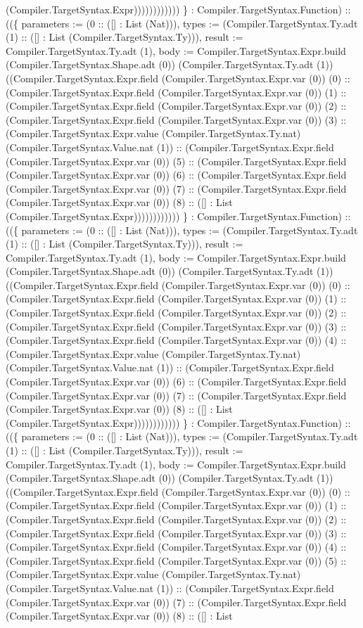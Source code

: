 \documentclass[11pt]{article}
\begin{document}
(Compiler.TargetSyntax.Expr)))))))))))) \} : Compiler.TargetSyntax.Function) :: ((\{ parameters := (0 :: ([] : List (Nat))), types := (Compiler.TargetSyntax.Ty.adt (1) :: ([] : List (Compiler.TargetSyntax.Ty))), result := Compiler.TargetSyntax.Ty.adt (1), body := Compiler.TargetSyntax.Expr.build (Compiler.TargetSyntax.Shape.adt (0)) (Compiler.TargetSyntax.Ty.adt (1)) ((Compiler.TargetSyntax.Expr.field (Compiler.TargetSyntax.Expr.var (0)) (0) :: (Compiler.TargetSyntax.Expr.field (Compiler.TargetSyntax.Expr.var (0)) (1) :: (Compiler.TargetSyntax.Expr.field (Compiler.TargetSyntax.Expr.var (0)) (2) :: (Compiler.TargetSyntax.Expr.field (Compiler.TargetSyntax.Expr.var (0)) (3) :: (Compiler.TargetSyntax.Expr.value (Compiler.TargetSyntax.Ty.nat) (Compiler.TargetSyntax.Value.nat (1)) :: (Compiler.TargetSyntax.Expr.field (Compiler.TargetSyntax.Expr.var (0)) (5) :: (Compiler.TargetSyntax.Expr.field (Compiler.TargetSyntax.Expr.var (0)) (6) :: (Compiler.TargetSyntax.Expr.field (Compiler.TargetSyntax.Expr.var (0)) (7) :: (Compiler.TargetSyntax.Expr.field (Compiler.TargetSyntax.Expr.var (0)) (8) :: ([] : List (Compiler.TargetSyntax.Expr)))))))))))) \} : Compiler.TargetSyntax.Function) :: ((\{ parameters := (0 :: ([] : List (Nat))), types := (Compiler.TargetSyntax.Ty.adt (1) :: ([] : List (Compiler.TargetSyntax.Ty))), result := Compiler.TargetSyntax.Ty.adt (1), body := Compiler.TargetSyntax.Expr.build (Compiler.TargetSyntax.Shape.adt (0)) (Compiler.TargetSyntax.Ty.adt (1)) ((Compiler.TargetSyntax.Expr.field (Compiler.TargetSyntax.Expr.var (0)) (0) :: (Compiler.TargetSyntax.Expr.field (Compiler.TargetSyntax.Expr.var (0)) (1) :: (Compiler.TargetSyntax.Expr.field (Compiler.TargetSyntax.Expr.var (0)) (2) :: (Compiler.TargetSyntax.Expr.field (Compiler.TargetSyntax.Expr.var (0)) (3) :: (Compiler.TargetSyntax.Expr.field (Compiler.TargetSyntax.Expr.var (0)) (4) :: (Compiler.TargetSyntax.Expr.value (Compiler.TargetSyntax.Ty.nat) (Compiler.TargetSyntax.Value.nat (1)) :: (Compiler.TargetSyntax.Expr.field (Compiler.TargetSyntax.Expr.var (0)) (6) :: (Compiler.TargetSyntax.Expr.field (Compiler.TargetSyntax.Expr.var (0)) (7) :: (Compiler.TargetSyntax.Expr.field (Compiler.TargetSyntax.Expr.var (0)) (8) :: ([] : List (Compiler.TargetSyntax.Expr)))))))))))) \} : Compiler.TargetSyntax.Function) :: ((\{ parameters := (0 :: ([] : List (Nat))), types := (Compiler.TargetSyntax.Ty.adt (1) :: ([] : List (Compiler.TargetSyntax.Ty))), result := Compiler.TargetSyntax.Ty.adt (1), body := Compiler.TargetSyntax.Expr.build (Compiler.TargetSyntax.Shape.adt (0)) (Compiler.TargetSyntax.Ty.adt (1)) ((Compiler.TargetSyntax.Expr.field (Compiler.TargetSyntax.Expr.var (0)) (0) :: (Compiler.TargetSyntax.Expr.field (Compiler.TargetSyntax.Expr.var (0)) (1) :: (Compiler.TargetSyntax.Expr.field (Compiler.TargetSyntax.Expr.var (0)) (2) :: (Compiler.TargetSyntax.Expr.field (Compiler.TargetSyntax.Expr.var (0)) (3) :: (Compiler.TargetSyntax.Expr.field (Compiler.TargetSyntax.Expr.var (0)) (4) :: (Compiler.TargetSyntax.Expr.field (Compiler.TargetSyntax.Expr.var (0)) (5) :: (Compiler.TargetSyntax.Expr.value (Compiler.TargetSyntax.Ty.nat) (Compiler.TargetSyntax.Value.nat (1)) :: (Compiler.TargetSyntax.Expr.field (Compiler.TargetSyntax.Expr.var (0)) (7) :: (Compiler.TargetSyntax.Expr.field (Compiler.TargetSyntax.Expr.var (0)) (8) :: ([] : List 
\end{document}
